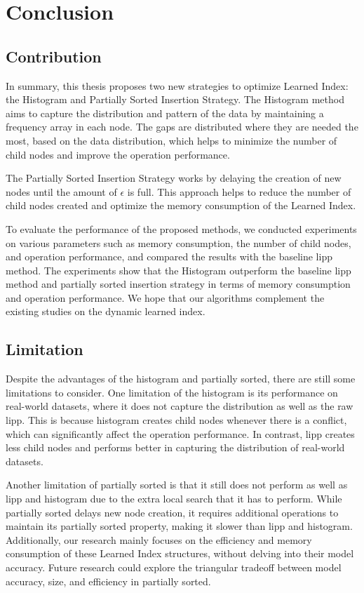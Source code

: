 \documentclass[11pt,a4paper]{article}
\newcommand{\learnindex}{\textsf{Learned Index}\xspace}
\begin{document}
\section{Conclusion}
\subsection{Contribution}
In summary, this thesis proposes two new strategies to optimize \learnindex: the Histogram and Partially Sorted Insertion Strategy. The Histogram method aims to capture the distribution and pattern of the data by maintaining a frequency array in each node. The gaps are distributed where they are needed the most, based on the data distribution, which helps to minimize the number of child nodes and improve the operation performance.

The Partially Sorted Insertion Strategy works by delaying the creation of new nodes until the amount of $\epsilon$ is full. This approach helps to reduce the number of child nodes created and optimize the memory consumption of the \learnindex.

To evaluate the performance of the proposed methods, we conducted experiments on various parameters such as memory consumption, the number of child nodes, and operation performance, and compared the results with the baseline \acrshort{lipp} method. The experiments show that the Histogram outperform the baseline \acrshort{lipp} method and partially sorted insertion strategy in terms of memory consumption and operation performance. We hope that our algorithms complement the existing studies on the dynamic learned index.

\subsection{Limitation}
Despite the advantages of the histogram and partially sorted, there are still some limitations to consider. One limitation of the histogram is its performance on real-world datasets, where it does not capture the distribution as well as the raw \acrshort{lipp}. This is because histogram creates child nodes whenever there is a conflict, which can significantly affect the operation performance. In contrast, \acrshort{lipp} creates less child nodes and performs better in capturing the distribution of real-world datasets.

Another limitation of partially sorted is that it still does not perform as well as \acrshort{lipp} and histogram due to the extra local search that it has to perform. While partially sorted delays new node creation, it requires additional operations to maintain its partially sorted property, making it slower than \acrshort{lipp} and histogram. Additionally, our research mainly focuses on the efficiency and memory consumption of these \learnindex structures, without delving into their model accuracy. Future research could explore the triangular tradeoff between model accuracy, size, and efficiency in partially sorted.
\end{document}
